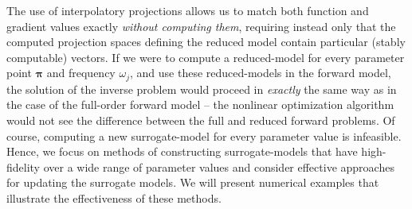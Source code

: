 \documentclass{report}
\begin{document}
The use of interpolatory projections allows us to match both function and
gradient values exactly
\emph{without computing them}, requiring instead only that
the computed projection spaces defining the reduced model
contain particular (stably computable) vectors.
If we were to compute a reduced-model for every
parameter point $\boldsymbol{\pi}$ and frequency $\omega_j$,
and use these
reduced-models in the forward model,
the solution of the inverse problem would proceed in {\em exactly} the same way
as in the case of the full-order forward model --
the nonlinear optimization algorithm would not see the difference between the
full and reduced forward problems.
Of course, computing a new surrogate-model for every parameter value is infeasible.
Hence, we focus on methods of constructing surrogate-models that have
high-fidelity over a wide range of parameter values and consider effective
approaches for updating the surrogate models. We will present numerical
examples that illustrate the effectiveness of these methods.
\end{document}
